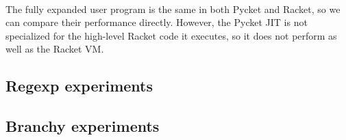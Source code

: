 		\paragraph{}%
		The fully expanded user program is the same in both Pycket and Racket, so we can compare their performance directly.  However, the Pycket JIT is not specialized for the high-level Racket code it executes, so it does not perform as well as the Racket VM.







		\subsection{Regexp experiments}
		\subsection{Branchy experiments}
			\label{section:branchy}


